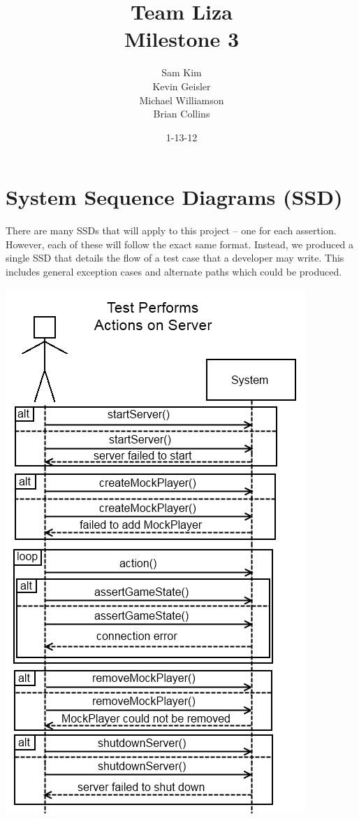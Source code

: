 \documentclass{article}
\title{Team Liza \\ Milestone 3}
\author{Sam Kim \\ Kevin Geisler \\ Michael Williamson \\ Brian Collins}
\date{1-13-12}
\begin{document}
\maketitle
\newpage

\tableofcontents

\newpage

\section{System Sequence Diagrams (SSD)}

There are many SSDs that will apply to this project -- one for each assertion. 
However, each of these will follow the exact same format. Instead, we
produced a single SSD that details the flow of a test case that a developer may
write.  This includes general exception cases and alternate paths which could be
produced.

\includegraphics{ssd}
\end{document}
